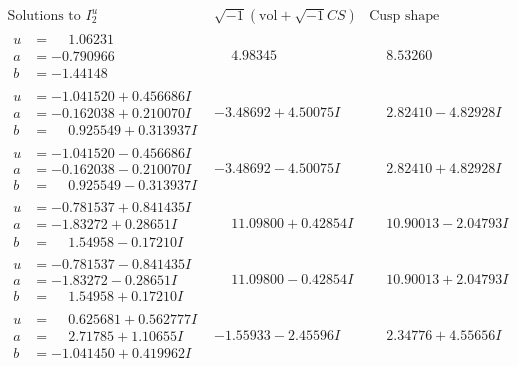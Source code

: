 \documentclass[1p]{elsarticle_modified}
\theoremstyle{definition}
\newcommand{\I}{\sqrt{-1}}
\begin{document}
$$\begin{array}{c|c|c}  
\text{Solutions to }I^u_{2}& \I (\text{vol} + \sqrt{-1}CS) & \text{Cusp shape}\\
 \hline 
\begin{aligned}
u &= \phantom{-}1.06231\phantom{ +0.000000I} \\
a &= -0.790966\phantom{ +0.000000I} \\
b &= -1.44148\phantom{ +0.000000I}\end{aligned}
 & \phantom{-}4.98345\phantom{ +0.000000I} & \phantom{-}8.53260\phantom{ +0.000000I} \\ \hline\begin{aligned}
u &= -1.041520 + 0.456686 I \\
a &= -0.162038 + 0.210070 I \\
b &= \phantom{-}0.925549 + 0.313937 I\end{aligned}
 & -3.48692 + 4.50075 I & \phantom{-}2.82410 - 4.82928 I \\ \hline\begin{aligned}
u &= -1.041520 - 0.456686 I \\
a &= -0.162038 - 0.210070 I \\
b &= \phantom{-}0.925549 - 0.313937 I\end{aligned}
 & -3.48692 - 4.50075 I & \phantom{-}2.82410 + 4.82928 I \\ \hline\begin{aligned}
u &= -0.781537 + 0.841435 I \\
a &= -1.83272 + 0.28651 I \\
b &= \phantom{-}1.54958 - 0.17210 I\end{aligned}
 & \phantom{-}11.09800 + 0.42854 I & \phantom{-}10.90013 - 2.04793 I \\ \hline\begin{aligned}
u &= -0.781537 - 0.841435 I \\
a &= -1.83272 - 0.28651 I \\
b &= \phantom{-}1.54958 + 0.17210 I\end{aligned}
 & \phantom{-}11.09800 - 0.42854 I & \phantom{-}10.90013 + 2.04793 I \\ \hline\begin{aligned}
u &= \phantom{-}0.625681 + 0.562777 I \\
a &= \phantom{-}2.71785 + 1.10655 I \\
b &= -1.041450 + 0.419962 I\end{aligned}
 & -1.55933 - 2.45596 I & \phantom{-}2.34776 + 4.55656 I \\ \hline\begin{aligned}

\end{aligned}
\end{array}$$
\end{document}
